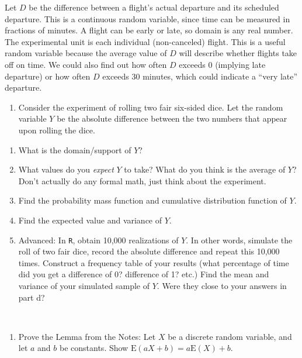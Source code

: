 \documentclass[
  letterpaper,
  DIV=11,
  numbers=noendperiod]{scrreprt}
\providecommand{\tightlist}{%
  \setlength{\itemsep}{0pt}\setlength{\parskip}{0pt}}\usepackage{longtable,booktabs,array}
\begin{document}
Let \(D\) be the difference between a flight's actual departure and its
scheduled departure. This is a continuous random variable, since time
can be measured in fractions of minutes. A flight can be early or late,
so domain is any real number. The experimental unit is each individual
(non-canceled) flight. This is a useful random variable because the
average value of \(D\) will describe whether flights take off on time.
We could also find out how often \(D\) exceeds 0 (implying late
departure) or how often \(D\) exceeds 30 minutes, which could indicate a
``very late'' departure.

\begin{enumerate}
\def\labelenumi{\arabic{enumi}.}
\setcounter{enumi}{3}
\tightlist
\item
  Consider the experiment of rolling two fair six-sided dice. Let the
  random variable \(Y\) be the absolute difference between the two
  numbers that appear upon rolling the dice.
\end{enumerate}

\begin{enumerate}
\def\labelenumi{\alph{enumi}.}
\tightlist
\item
  What is the domain/support of \(Y\)?\\
\item
  What values do you \emph{expect} \(Y\) to take? What do you think is
  the average of \(Y\)? Don't actually do any formal math, just think
  about the experiment.\\
\item
  Find the probability mass function and cumulative distribution
  function of \(Y\).\\
\item
  Find the expected value and variance of \(Y\).\\
\item
  Advanced: In \texttt{R}, obtain 10,000 realizations of \(Y\). In other
  words, simulate the roll of two fair dice, record the absolute
  difference and repeat this 10,000 times. Construct a frequency table
  of your results (what percentage of time did you get a difference of
  0? difference of 1? etc.) Find the mean and variance of your simulated
  sample of \(Y\). Were they close to your answers in part d?
\end{enumerate}

~

\begin{enumerate}
\def\labelenumi{\arabic{enumi}.}
\setcounter{enumi}{4}
\tightlist
\item
  Prove the Lemma from the Notes: Let \(X\) be a discrete random
  variable, and let \(a\) and \(b\) be constants. Show
  \(\mbox{E}(aX + b)=a\mbox{E}(X)+b\).
\end{enumerate}
\end{document}
